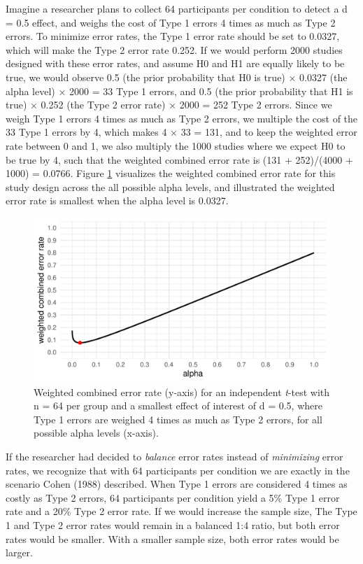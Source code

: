 \documentclass[
  english,
  ,man, a4paper,floatsintext]{apa6}
\begin{document}
Imagine a researcher plans to collect 64 participants per condition to detect a d = 0.5 effect, and weighs the cost of Type 1 errors 4 times as much as Type 2 errors. To minimize error rates, the Type 1 error rate should be set to 0.0327, which will make the Type 2 error rate 0.252. If we would perform 2000 studies designed with these error rates, and assume H0 and H1 are equally likely to be true, we would observe 0.5 (the prior probability that H0 is true) × 0.0327 (the alpha level) × 2000 = 33 Type 1 errors, and 0.5 (the prior probability that H1 is true) × 0.252 (the Type 2 error rate) × 2000 = 252 Type 2 errors. Since we weigh Type 1 errors 4 times as much as Type 2 errors, we multiple the cost of the 33 Type 1 errors by 4, which makes 4 × 33 = 131, and to keep the weighted error rate between 0 and 1, we also multiply the 1000 studies where we expect H0 to be true by 4, such that the weighted combined error rate is (131 + 252)/(4000 + 1000) = 0.0766. Figure \ref{fig:cost-plot} visualizes the weighted combined error rate for this study design across the all possible alpha levels, and illustrated the weighted error rate is smallest when the alpha level is 0.0327.

\begin{figure}
\centering
\includegraphics{Justify_in_Practice_files/figure-latex/cost-plot-1.pdf}
\caption{\label{fig:cost-plot}Weighted combined error rate (y-axis) for an independent \emph{t}-test with n = 64 per group and a smallest effect of interest of d = 0.5, where Type 1 errors are weighed 4 times as much as Type 2 errors, for all possible alpha levels (x-axis).}
\end{figure}

If the researcher had decided to \emph{balance} error rates instead of \emph{minimizing} error rates, we recognize that with 64 participants per condition we are exactly in the scenario Cohen (1988) described. When Type 1 errors are considered 4 times as costly as Type 2 errors, 64 participants per condition yield a 5\% Type 1 error rate and a 20\% Type 2 error rate. If we would increase the sample size, The Type 1 and Type 2 error rates would remain in a balanced 1:4 ratio, but both error rates would be smaller. With a smaller sample size, both error rates would be larger.
\end{document}
